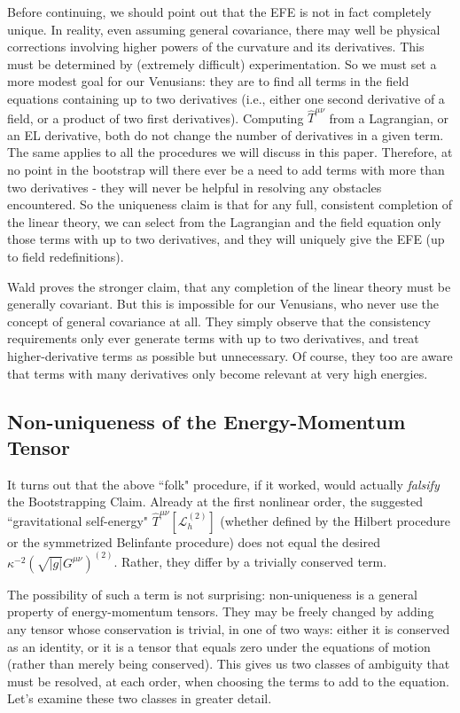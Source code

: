 \documentclass[aps,physrev,preprint,groupedaddress]{revtex4-2}
\begin{document}
Before continuing, we should point out that the EFE is not in fact completely unique. In reality, even assuming general covariance, there may well be physical corrections involving higher powers of the curvature and its derivatives. This must be determined by (extremely difficult) experimentation. So we must set a more modest goal for our Venusians: they are to find all terms in the field equations containing up to two derivatives (i.e., either one second derivative of a field, or a product of two first derivatives). Computing $\widehat{T}^{\mu\nu}$ from a Lagrangian, or an EL derivative, both do not change the number of derivatives in a given term. The same applies to all the procedures we will discuss in this paper. Therefore, at no point in the bootstrap will there ever be a need to add terms with more than two derivatives - they will never be helpful in resolving any obstacles encountered. So the uniqueness claim is that for any full, consistent completion of the linear theory, we can select from the Lagrangian and the field equation only those terms with up to two derivatives, and they will uniquely give the EFE (up to field redefinitions). 

Wald\cite{Wald} proves the stronger claim, that any completion of the linear theory must be generally covariant. But this is impossible for our Venusians, who never use the concept of general covariance at all. They simply observe that the consistency requirements only ever generate terms with up to two derivatives, and treat higher-derivative terms as possible but unnecessary. Of course, they too are aware that terms with many derivatives only become relevant at very high energies.
 
\subsection{Non-uniqueness of the Energy-Momentum Tensor}
It turns out that the above ``folk" procedure, if it worked, would actually \textit{falsify} the Bootstrapping Claim. Already at the first nonlinear order, the suggested ``gravitational self-energy" \({\widehat{T}}^{\mu\nu}\left\lbrack \mathcal{L}_{h}^{(2)} \right\rbrack\) (whether defined by the Hilbert procedure or the symmetrized Belinfante procedure) does not equal the desired \(\kappa^{-2}\left(\sqrt{|g|}G^{\mu\nu}\right)^{(2)}\). Rather, they differ by a trivially conserved term.

The possibility of such a term is not surprising: non-uniqueness is a general property of energy-momentum tensors. They may be freely changed by adding any tensor whose conservation is trivial, in one of two ways: either it is conserved as an identity, or it is a tensor that equals zero under the equations of motion (rather than merely being conserved). This gives us two classes of ambiguity that must be resolved, at each order, when choosing the terms to add to the equation. Let's examine these two classes in greater detail.
\end{document}
